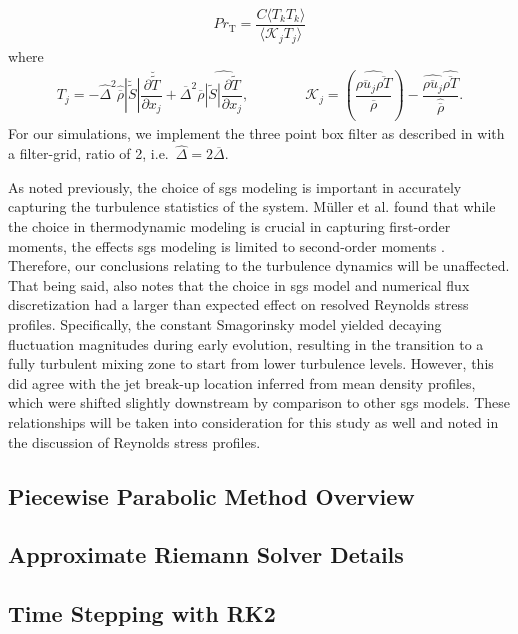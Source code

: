 \begin{equation}
\begin{aligned}
	Pr_\text{T} = \dfrac{C \langle T_k T_k  \rangle}{\langle \mathcal{K}_j T_j \rangle}
\end{aligned}
\end{equation}
where 
\begin{equation}
\begin{aligned}
	T_j = - \widehat{\Delta}^2  \widehat{\overline{\rho}} |\breve{\widetilde{S}}| \dfrac{\partial \breve{\widetilde{T}}}{\partial x_j} +  \overline{\Delta}^2  \overline{\rho} \widehat{|\widetilde{S}| \dfrac{\partial \widetilde{T}}{\partial x_j}}, \qquad \qquad \mathcal{K}_j = \left( \dfrac{ \widehat{\overline{\rho u_j} \overline{\rho T}}}{\overline{\rho}} \right) - \dfrac{ \widehat{\overline{\rho u_j}} \widehat{ \overline{\rho T}}}{\widehat{\overline{\rho}}}.
\end{aligned}
\end{equation}
For our simulations, we implement the three point box filter as described in \cite{filter} with a filter-grid, ratio of 2, i.e.\  $\widehat{\Delta}=2\overline{\Delta}$. 

As noted previously, the choice of \gls{sgs} modeling is important in accurately capturing the turbulence statistics of the system. M\"{u}ller et al. found that while the choice in thermodynamic modeling is crucial in capturing first-order moments, the effects \gls{sgs} modeling is limited to second-order moments \cite{doi:10.1063/1.4937948}.  Therefore, our conclusions relating to the turbulence dynamics will be unaffected. That being said, \cite{doi:10.1063/1.4937948} also notes that the choice in \gls{sgs} model and numerical flux discretization had a larger than expected effect on resolved Reynolds stress profiles. Specifically, the constant Smagorinsky model yielded decaying fluctuation magnitudes during early evolution, resulting in the transition to a fully turbulent mixing zone to start from lower turbulence levels. However, this did agree with the jet break-up location inferred from mean density profiles, which were shifted slightly downstream by comparison to other \gls{sgs} models. These relationships will be taken into consideration for this study as well and noted in the discussion of Reynolds stress profiles.

\subsection{Piecewise Parabolic Method Overview}
\subsection{Approximate Riemann Solver Details}
\subsection{Time Stepping with RK2}

